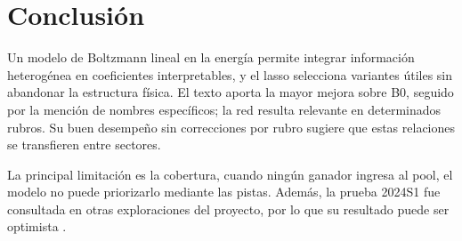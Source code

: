 
\balance
\section{Conclusión}

Un modelo de Boltzmann lineal en la energía permite integrar información heterogénea en coeficientes interpretables, y el lasso selecciona variantes útiles sin abandonar la estructura física. El texto aporta la mayor mejora sobre B0, seguido por la mención de nombres específicos; la red resulta relevante en determinados rubros. Su buen desempeño sin correcciones por rubro sugiere que estas relaciones se transfieren entre sectores.


La principal limitación es la cobertura, cuando ningún ganador ingresa al pool, el modelo no puede priorizarlo mediante las pistas. Además, la prueba 2024S1 fue consultada en otras exploraciones del proyecto, por lo que su resultado puede ser optimista \cite{cawley2010}. 
